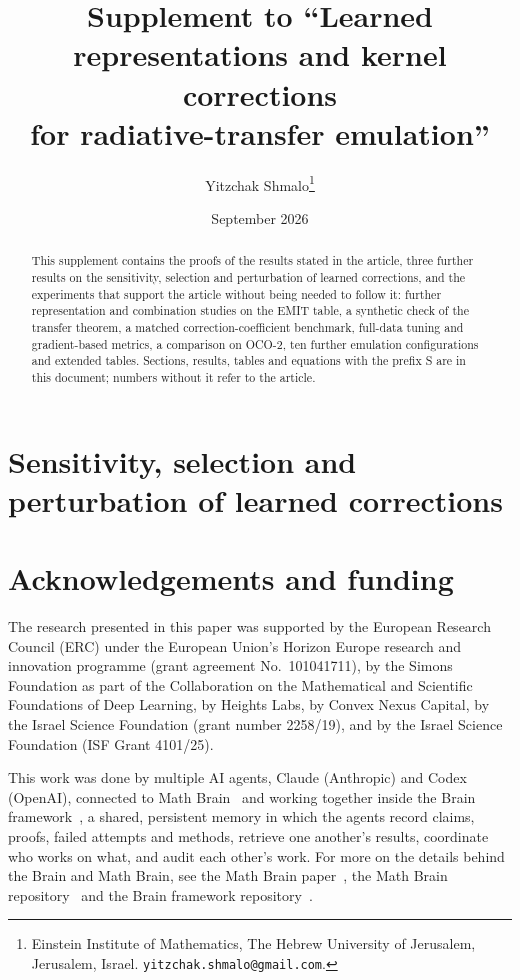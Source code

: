 \documentclass[11pt]{article}
\title{Supplement to ``Learned representations and kernel corrections\\ for radiative-transfer emulation''}
\author{Yitzchak Shmalo\thanks{Einstein Institute of Mathematics, The Hebrew University of Jerusalem, Jerusalem, Israel. \texttt{yitzchak.shmalo@gmail.com}.}}
\date{September 2026}
\newcommand{\1}{\mathbf{1}}
\numberwithin{equation}{section}
\begin{document}
\maketitle

\begin{abstract}
This supplement contains the proofs of the results stated in the article, three further results on the
sensitivity, selection and perturbation of learned corrections, and the experiments that support the article
without being needed to follow it: further representation and combination studies on the EMIT table, a synthetic
check of the transfer theorem, a matched correction-coefficient benchmark, full-data tuning and gradient-based
metrics, a comparison on OCO-2, ten further emulation configurations and extended tables. Sections, results,
tables and equations with the prefix S are in this document; numbers without it refer to the article.
\end{abstract}

\section{Sensitivity, selection and perturbation of learned corrections}\label{supp:sensitivity}













\section*{Acknowledgements and funding}

The research presented in this paper was supported by the European Research Council (ERC) under
the European Union's Horizon Europe research and innovation programme (grant agreement
No.~101041711), by the Simons Foundation as part of the Collaboration on the Mathematical and
Scientific Foundations of Deep Learning, by Heights Labs, by Convex Nexus Capital, by the Israel
Science Foundation (grant number 2258/19), and by the Israel Science Foundation (ISF Grant
4101/25).

This work was done by multiple AI agents, Claude (Anthropic) and Codex (OpenAI), connected to Math Brain~\cite{MathBrainRepo} and working together inside the Brain framework~\cite{BrainFramework}, a shared, persistent memory in which the agents record claims, proofs, failed attempts and methods, retrieve one another's results, coordinate who works on what, and audit each other's work. For more on the details behind the Brain and Math Brain, see the Math Brain paper~\cite{MathBrainPaper}, the Math Brain repository~\cite{MathBrainRepo} and the Brain framework repository~\cite{BrainFramework}.
\end{document}
